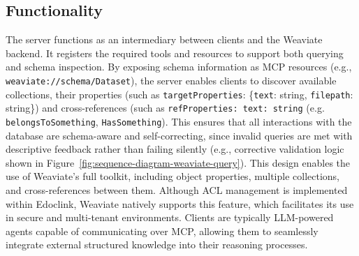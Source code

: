 \subsection{Functionality}
The server functions as an intermediary between clients and the Weaviate backend. It registers the required tools and resources to support both querying and schema inspection. By exposing schema information as MCP resources (e.g., \texttt{weaviate://schema/Dataset}), the server enables clients to discover available collections, their properties (such as \texttt{targetProperties}: \{\texttt{text}: string, \texttt{filepath}: string\}) and cross-references (such as \texttt{refProperties: \texttt{text}: string} (e.g. \texttt{belongsToSomething}, \texttt{HasSomething}). This ensures that all interactions with the database are schema-aware and self-correcting, since invalid queries are met with descriptive feedback rather than failing silently (e.g., corrective validation logic shown in Figure~\ref{fig:sequence-diagram-weaviate-query}).
This design enables the use of Weaviate’s full toolkit, including object properties, multiple collections, and cross-references between them. Although ACL management is implemented within Edoclink, Weaviate natively supports this feature, which facilitates its use in secure and multi-tenant environments. Clients are typically \gls{LLM}-powered agents capable of communicating over \gls{MCP}, allowing them to seamlessly integrate external structured knowledge into their reasoning processes.


